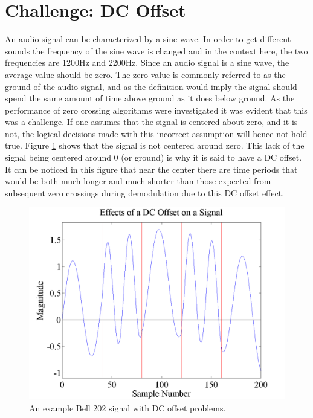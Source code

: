 \section{Challenge: DC Offset}
An audio signal can be characterized by a sine wave. In order to get different sounds the frequency of the sine wave is changed and in the context here, the two frequencies are 1200Hz and 2200Hz. Since an audio signal is a sine wave, the average value should be zero. The zero value is commonly referred to as the ground of the audio signal, and as the definition would imply the signal should spend the same amount of time above ground as it does below ground. As the performance of zero crossing algorithms were investigated it was evident that this was a challenge. If one assumes that the signal is centered about zero, and it is not, the logical decisions made with this incorrect assumption will hence not hold true. Figure \ref{DCOffsetExample} shows that the signal is not centered around zero. This lack of the signal being centered around 0 (or ground) is why it is said to have a DC offset. It can be noticed in this figure that near the center there are time periods that would be both much longer and much shorter than those expected from subsequent zero crossings during demodulation due to this DC offset effect.
\begin{figure}
  \centering
	\includegraphics[width=0.75\linewidth]{images/EffectsofaDCOffsetonaSignal.png} 
	\caption{An example Bell 202 signal with DC offset problems.}
   \label{DCOffsetExample}
\end{figure}

